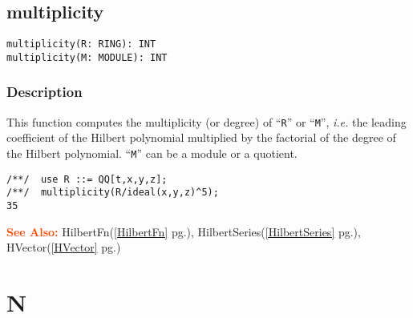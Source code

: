 \documentclass[a4paper]{mybook}
\newenvironment{command}{}{} %
\newcommand\SeeAlso{\par\textcolor{OrangeRed}{\textbf{\large See Also: }}}
\begin{document}
\section{multiplicity}
\label{multiplicity}
\begin{command} %


\begin{Verbatim}[label=syntax, rulecolor=\color{MidnightBlue},
frame=single]
multiplicity(R: RING): INT
multiplicity(M: MODULE): INT
\end{Verbatim}


\subsection*{Description}

This function computes the multiplicity (or degree) of ``\verb&R&'' or ``\verb&M&'',
\textit{i.e.} the leading coefficient of the Hilbert polynomial multiplied by
the factorial of the degree of the Hilbert polynomial.
``\verb&M&'' can be a module or a quotient.
\begin{Verbatim}[label=example, rulecolor=\color{PineGreen}, frame=single]
/**/  use R ::= QQ[t,x,y,z];
/**/  multiplicity(R/ideal(x,y,z)^5);
35
\end{Verbatim}


\SeeAlso %
  HilbertFn(\ref{HilbertFn} pg.\pageref{HilbertFn}), 
    HilbertSeries(\ref{HilbertSeries} pg.\pageref{HilbertSeries}), 
    HVector(\ref{HVector} pg.\pageref{HVector})
\end{command} %

\chapter{N}  %
\label{N}
\end{document}
